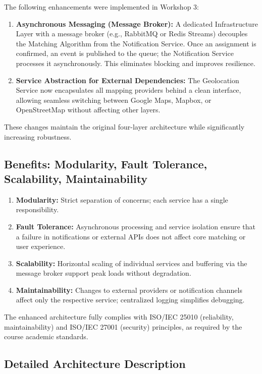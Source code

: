 \documentclass[9pt,conference]{IEEEtran}
\begin{document}
The following enhancements were implemented in Workshop 3:

\begin{enumerate}
    \item \textbf{Asynchronous Messaging (Message Broker):} A dedicated Infrastructure Layer with a message broker (e.g., RabbitMQ or Redis Streams) decouples the Matching Algorithm from the Notification Service. Once an assignment is confirmed, an event is published to the queue; the Notification Service processes it asynchronously. This eliminates blocking and improves resilience.
    \item \textbf{Service Abstraction for External Dependencies:} The Geolocation Service now encapsulates all mapping providers behind a clean interface, allowing seamless switching between Google Maps, Mapbox, or OpenStreetMap without affecting other layers.
\end{enumerate}

These changes maintain the original four-layer architecture while significantly increasing robustness.

\subsection{Benefits: Modularity, Fault Tolerance, Scalability, Maintainability}

\begin{enumerate}
    \item \textbf{Modularity:} Strict separation of concerns; each service has a single responsibility.
    \item \textbf{Fault Tolerance:} Asynchronous processing and service isolation ensure that a failure in notifications or external APIs does not affect core matching or user experience.
    \item \textbf{Scalability:} Horizontal scaling of individual services and buffering via the message broker support peak loads without degradation.
    \item \textbf{Maintainability:} Changes to external providers or notification channels affect only the respective service; centralized logging simplifies debugging.
\end{enumerate}

The enhanced architecture fully complies with ISO/IEC 25010 (reliability, maintainability) and ISO/IEC 27001 (security) principles, as required by the course academic standards.

\subsection{Detailed Architecture Description}
\end{document}
